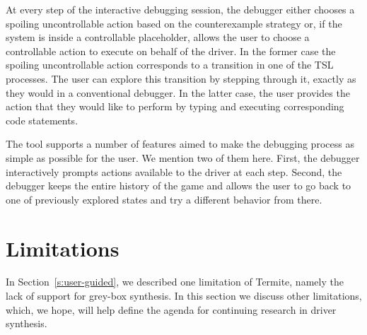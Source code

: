 \documentclass[a4paper,twoside,openright,11pt]{book}
\newcommand{\termite}{Termite\xspace}
\newcommand{\tsl}{TSL\xspace}
\theoremstyle{definition}
\begin{document}
At every step of the interactive debugging session, the debugger either chooses a spoiling uncontrollable action based on the counterexample strategy or, if the system is inside a controllable placeholder, allows the user to choose a controllable action to execute on behalf of the driver.  In the former case the spoiling uncontrollable action corresponds to a transition in one of the \tsl processes.  The user can explore this transition by stepping through it, exactly as they would in a conventional debugger.  In the latter case, the user provides the action that they would like to perform by typing and executing corresponding code statements.

The tool supports a number of features aimed to make the debugging process as simple as possible for the user. We mention two of them here.  First, the debugger interactively prompts actions available to the driver at each step.  Second, the debugger keeps the entire history of the game and allows the user to go back to one of previously explored states and try a different behavior from there.

\section{Limitations}\label{s:limitations}

In Section~\ref{s:user-guided}, we described one limitation of \termite, namely the lack of support for grey-box synthesis.  In this section we discuss other limitations, which, we hope, will help define the agenda for continuing research in driver synthesis.



\end{document}

